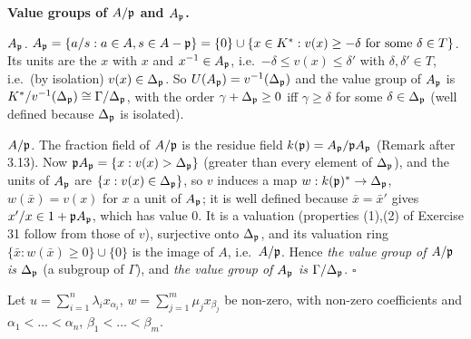 \documentclass[11pt]{article}
\begin{document}
\textbf{Value groups of $A/\mathfrak p$ and $A_\mathfrak p$.}

\emph{$A_\mathfrak p$.} $A_\mathfrak p=\{a/s:a\in A,s\in A-\mathfrak p\}=\{0\}\cup\{x\in K^*:v(x)\ge-\delta\text{ for some }\delta\in T\}$. Its units are the $x$ with $x$ and $x^{-1}\in A_\mathfrak p$, i.e.\ $-\delta\le v(x)\le\delta'$ with $\delta,\delta'\in T$, i.e.\ (by isolation) $v(x)\in\Delta_\mathfrak p$. So $U(A_\mathfrak p)=v^{-1}(\Delta_\mathfrak p)$ and the value group of $A_\mathfrak p$ is $K^*/v^{-1}(\Delta_\mathfrak p)\cong\Gamma/\Delta_\mathfrak p$, with the order $\gamma+\Delta_\mathfrak p\ge0$ iff $\gamma\ge\delta$ for some $\delta\in\Delta_\mathfrak p$ (well defined because $\Delta_\mathfrak p$ is isolated).

\emph{$A/\mathfrak p$.} The fraction field of $A/\mathfrak p$ is the residue field $k(\mathfrak p)=A_\mathfrak p/\mathfrak p A_\mathfrak p$ (Remark after 3.13). Now $\mathfrak p A_\mathfrak p=\{x:v(x)>\Delta_\mathfrak p\}$ (greater than every element of $\Delta_\mathfrak p$), and the units of $A_\mathfrak p$ are $\{x:v(x)\in\Delta_\mathfrak p\}$, so $v$ induces a map $w:k(\mathfrak p)^*\to\Delta_\mathfrak p$, $w(\bar x)=v(x)$ for $x$ a unit of $A_\mathfrak p$; it is well defined because $\bar x=\bar x'$ gives $x'/x\in1+\mathfrak p A_\mathfrak p$, which has value $0$. It is a valuation (properties (1),(2) of Exercise 31 follow from those of $v$), surjective onto $\Delta_\mathfrak p$, and its valuation ring $\{\bar x:w(\bar x)\ge0\}\cup\{0\}$ is the image of $A$, i.e.\ $A/\mathfrak p$. Hence \emph{the value group of $A/\mathfrak p$ is $\Delta_\mathfrak p$} (a subgroup of $\Gamma$), and \emph{the value group of $A_\mathfrak p$ is $\Gamma/\Delta_\mathfrak p$}. \hfill$\square$

\pf
Let $u=\sum_{i=1}^n\lambda_ix_{\alpha_i}$, $w=\sum_{j=1}^m\mu_jx_{\beta_j}$ be non-zero, with non-zero coefficients and $\alpha_1<\dots<\alpha_n$, $\beta_1<\dots<\beta_m$.
\end{document}
